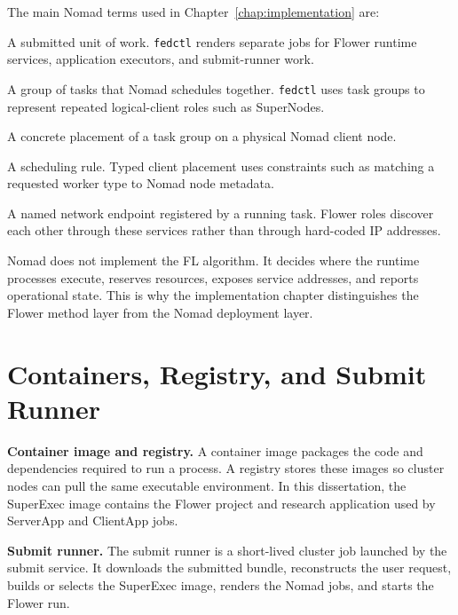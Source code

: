 The main Nomad terms used in Chapter~\ref{chap:implementation} are:

\begin{description}[leftmargin=2.8cm, style=nextline]
  \item[Job] A submitted unit of work. \texttt{fedctl} renders separate jobs for Flower runtime services, application executors, and submit-runner work.
  \item[Task group] A group of tasks that Nomad schedules together. \texttt{fedctl} uses task groups to represent repeated logical-client roles such as SuperNodes.
  \item[Allocation] A concrete placement of a task group on a physical Nomad client node.
  \item[Constraint] A scheduling rule. Typed client placement uses constraints such as matching a requested worker type to Nomad node metadata.
  \item[Service] A named network endpoint registered by a running task. Flower roles discover each other through these services rather than through hard-coded IP addresses.
\end{description}

Nomad does not implement the FL algorithm. It decides where the runtime processes execute, reserves resources, exposes service addresses, and reports operational state. This is why the implementation chapter distinguishes the Flower method layer from the Nomad deployment layer.

\section{Containers, Registry, and Submit Runner}
\label{def:containers_registry_submit_runner}

\begin{definition}
\textbf{Container image and registry.}
A container image packages the code and dependencies required to run a process. A registry stores these images so cluster nodes can pull the same executable environment. In this dissertation, the SuperExec image contains the Flower project and research application used by ServerApp and ClientApp jobs.
\end{definition}

\begin{definition}
\textbf{Submit runner.}
The submit runner is a short-lived cluster job launched by the submit service. It downloads the submitted bundle, reconstructs the user request, builds or selects the SuperExec image, renders the Nomad jobs, and starts the Flower run.
\end{definition}

